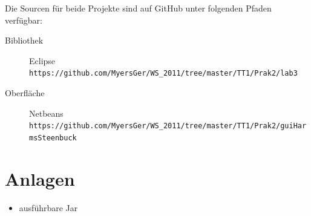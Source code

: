 \documentclass[10pt]{scrartcl}
\begin{document}
Die Sourcen für beide Projekte sind auf GitHub unter folgenden Pfaden verfügbar:
\begin{description}
	\item[Bibliothek] Eclipse \\ \verb!https://github.com/MyersGer/WS_2011/tree/master/TT1/Prak2/lab3!
	\item[Oberfläche] Netbeans \\ \verb!https://github.com/MyersGer/WS_2011/tree/master/TT1/Prak2/guiHarmsSteenbuck!
\end{description}

\section{Anlagen}
\begin{itemize}
	\item ausführbare Jar
\end{itemize}
\end{document}
